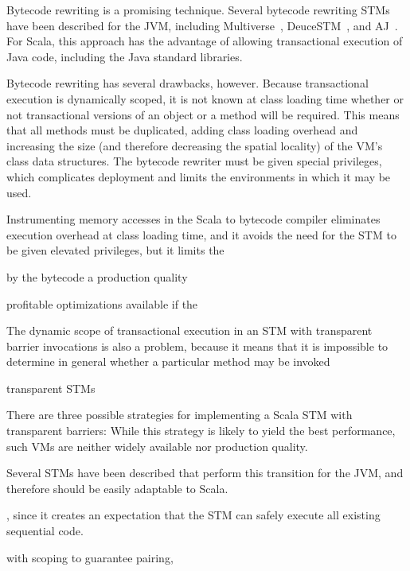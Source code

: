 Bytecode rewriting is a promising technique.  Several bytecode rewriting STMs
have been described for the JVM, including Multiverse~\cite{multiversewebsite},
DeuceSTM~\cite{??}, and AJ~\cite{popl09bronson}.  For Scala, this approach
has the advantage of allowing transactional execution of Java code,
including the Java standard libraries.

Bytecode rewriting has several drawbacks, however.  Because transactional
execution is dynamically scoped, it is not known at class loading time
whether or not transactional versions of an object or a method will
be required.  This means that all methods must be duplicated, adding
class loading overhead and increasing the size (and therefore decreasing
the spatial locality) of the VM's class data structures.  The bytecode
rewriter must be given special privileges, which complicates deployment
and limits the environments in which it may be used.

Instrumenting memory accesses in the Scala to bytecode compiler eliminates
execution overhead at class loading time, and it avoids the need for the STM to
be given elevated privileges, but it limits the 

by the bytecode 
a production quality 

profitable optimizations available
if the 

The dynamic scope of transactional execution in an STM with transparent barrier
invocations is also a problem, because it means that it is impossible to
determine in general whether a particular method may be invoked

transparent STMs

There are three possible strategies for implementing a Scala STM with
transparent barriers:
While this strategy is likely to yield
the best performance, such VMs are neither widely available nor production
quality.

Several STMs have been
described that perform this transition for the JVM, and therefore should be
easily adaptable to Scala.

, since it creates an expectation that the STM can
safely execute all existing sequential code.

with scoping to
guarantee pairing, 

